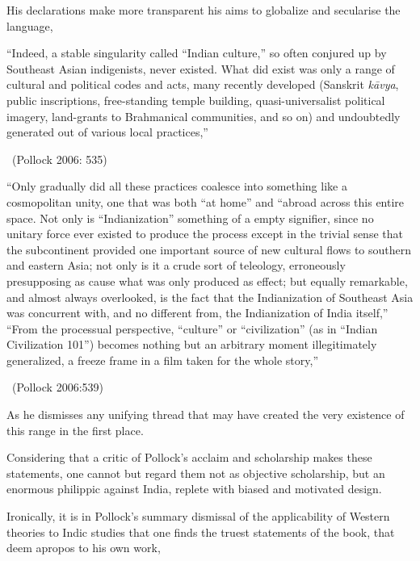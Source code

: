 His declarations make more transparent his aims to globalize and secularise the language,

\begin{myquote}
“Indeed, a stable singularity called “Indian culture,” so often conjured up by Southeast Asian indigenists, never existed. What did exist was only a range of cultural and political codes and acts, many recently developed (Sanskrit \textit{kāvya}, public inscriptions, free-standing temple building, quasi-universalist political imagery, land-grants to Brahmanical communities, and so on) and undoubtedly generated out of various local practices,” 

~\hfill (Pollock 2006: 535)
\end{myquote}

\begin{myquote}
“Only gradually did all these practices coalesce into something like a cosmopolitan unity, one that was both “at home” and “abroad across this entire space. Not only is “Indianization” something of a empty signifier, since no unitary force ever existed to produce the process except in the trivial sense that the subcontinent provided one important source of new cultural flows to southern and eastern Asia; not only is it a crude sort of teleology, erroneously presupposing as cause what was only produced as effect; but equally remarkable, and almost always overlooked, is the fact that the Indianization of Southeast Asia was concurrent with, and no different from, the Indianization of India itself,” “From the processual perspective, “culture” or “civilization” (as in “Indian Civilization 101”) becomes nothing but an arbitrary moment illegitimately generalized, a freeze frame in a film taken for the whole story,” 

~\hfill (Pollock 2006:539) 
\end{myquote}

As he dismisses any unifying thread that may have created the very existence of this range in the first place.

Considering that a critic of Pollock’s acclaim and scholarship makes these statements, one cannot but regard them not as objective scholarship, but an enormous philippic against India, replete with biased and motivated design.

Ironically, it is in Pollock’s summary dismissal of the applicability of Western theories to Indic studies that one finds the truest statements of the book, that deem apropos to his own work,

